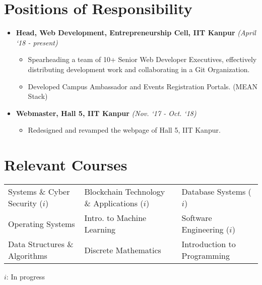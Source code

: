 \documentclass[a4paper,20pt]{article}
\begin{document}
\section{Positions of Responsibility}

\begin{itemize}
	\setlength\itemsep{0pt}
\item \textbf{Head, Web Development, Entrepreneurship Cell, IIT Kanpur}	
	\hfill \textit{(April ‘18 - present)}
	\begin{itemize}
		\setlength\itemsep{0pt}
		\item Spearheading a team of 10+ Senior Web Developer Executives,	
			effectively distributing development work and collaborating in a Git Organization.
		\item Developed Campus Ambassador and Events Registration Portals. (MEAN Stack)
	\end{itemize}

\item \textbf{Webmaster, Hall 5, IIT Kanpur}
	\hfill \textit{(Nov. ‘17 - Oct. ‘18)}
	\begin{itemize}
		\setlength\itemsep{0pt}
		\item Redesigned and revamped the webpage of Hall 5, IIT Kanpur.\vspace*{-8pt}
	\end{itemize}

\end{itemize}\vspace*{-6pt}

\section{Relevant Courses}
{\fontsize{10pt}{1em}\upshape\color{black}
	\begin{tabular*}{\textwidth}{l l l}
		Systems \& Cyber Security ($i$) 
		& \hspace{3em} Blockchain Technology \& Applications ($i$) 
		& \hspace{3em} Database Systems ($i$)
		\\
		Operating Systems
		& \hspace{3em} Intro. to Machine Learning
		& \hspace{3em} Software Engineering ($i$)
		\\
		Data Structures \& Algorithms 
		&\hspace{3em} Discrete Mathematics 
		&\hspace{3em} Introduction to Programming
		\\
	\end{tabular*}
}
\hspace*{\fill} 
$i$: In progress\\
\end{document}
